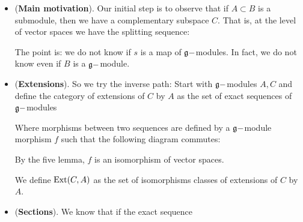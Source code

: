 \begin{itemize}
    \item (\textbf{Main motivation}). Our initial step is to observe that if $A\subset B$ is a submodule, 
    then we have a complementary subspace $C$. That is, at the level of vector 
    spaces we have the splitting sequence: 
    \begin{center}
    \end{center}
The point is: we do not know if $s$ is a map of $\mathfrak{g}-$modules. In fact, we do not know even if $B$ is a $\mathfrak{g}-$module.
\item(\textbf{Extensions}).  So we try the inverse path: Start with $\mathfrak{g}-$modules $A,C$ and define the category of extensions 
of $C$ by $A$ as the set of exact sequences of $\mathfrak{g}-$modules 
\begin{center}
\end{center}
Where morphisms between two sequences are defined by a $\mathfrak{g}-$module morphism $f$  
such that the following diagram commutes:
\begin{center}
\end{center}
By the five lemma, $f$ is an isomorphism of vector spaces. 
\begin{dang}
    \begin{definition}
        We define $\text{Ext}(C,A)$ as the set of isomorphisms classes of extensions of $C$ by $A$.
    \end{definition}
\end{dang}
\item(\textbf{Sections}). We know that if the exact sequence 
    \begin{center}
\end{center}
\end{itemize}

